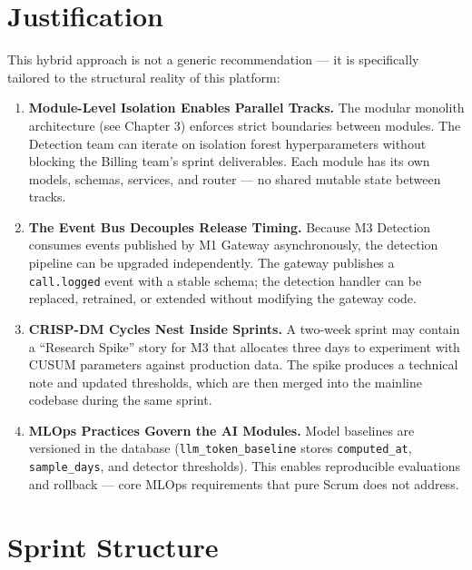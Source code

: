 \documentclass[12pt,a4paper,twoside]{report}
\begin{document}
\section{Justification}

This hybrid approach is not a generic recommendation — it is specifically tailored to the structural reality of this platform:

\begin{enumerate}
  \item \textbf{Module-Level Isolation Enables Parallel Tracks.} The modular monolith architecture (see Chapter 3) enforces strict boundaries between modules. The Detection team can iterate on isolation forest hyperparameters without blocking the Billing team's sprint deliverables. Each module has its own models, schemas, services, and router — no shared mutable state between tracks.

  \item \textbf{The Event Bus Decouples Release Timing.} Because M3 Detection consumes events published by M1 Gateway asynchronously, the detection pipeline can be upgraded independently. The gateway publishes a \texttt{call.logged} event with a stable schema; the detection handler can be replaced, retrained, or extended without modifying the gateway code.

  \item \textbf{CRISP-DM Cycles Nest Inside Sprints.} A two-week sprint may contain a ``Research Spike'' story for M3 that allocates three days to experiment with CUSUM parameters against production data. The spike produces a technical note and updated thresholds, which are then merged into the mainline codebase during the same sprint.

  \item \textbf{MLOps Practices Govern the AI Modules.} Model baselines are versioned in the database (\texttt{llm\_token\_baseline} stores \texttt{computed\_at}, \texttt{sample\_days}, and detector thresholds). This enables reproducible evaluations and rollback — core MLOps requirements that pure Scrum does not address.
\end{enumerate}

\section{Sprint Structure}
\end{document}
